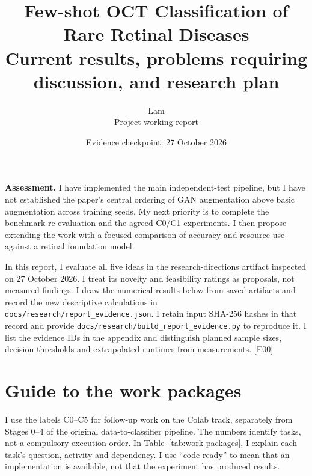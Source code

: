\documentclass[11pt,a4paper]{article}
\title{Few-shot OCT Classification of Rare Retinal Diseases\\
  \large Current results, problems requiring discussion, and research plan}
\author{Lam\\\small Project working report}
\date{Evidence checkpoint: 27 October 2026}
\newcommand{\file}[1]{\nolinkurl{#1}}
\newcommand{\ev}[1]{\textcolor{Link}{\textsf{[#1]}}}
\begin{document}
\maketitle

\textbf{Assessment.} I have implemented the main independent-test pipeline,
but I have not established the paper's central ordering of GAN augmentation
above basic augmentation across training seeds. My next priority is to complete
the benchmark re-evaluation and the agreed C0/C1 experiments. I then propose
extending the work with a focused comparison of accuracy and resource use
against a retinal foundation model.

In this report, I evaluate all five ideas in the research-directions artifact
inspected on 27 October 2026. I treat its novelty and feasibility ratings as
proposals, not measured findings. I draw the numerical results below from
saved artifacts and record the new descriptive calculations in
\file{docs/research/report_evidence.json}. I retain input SHA-256 hashes in that
record and provide \file{docs/research/build_report_evidence.py} to reproduce
it. I list the evidence IDs in the appendix and distinguish planned sample
sizes, decision thresholds and extrapolated runtimes from measurements.
\ev{E00}

\section{Guide to the work packages}

I use the labels C0--C5 for follow-up work on the Colab track, separately
from Stages 0--4 of the original data-to-classifier pipeline. The numbers
identify tasks, not a compulsory execution order. In
Table~\ref{tab:work-packages}, I explain each task's question, activity and
dependency. I use ``code ready'' to mean that an implementation is available,
not that the experiment has produced results.
\end{document}

